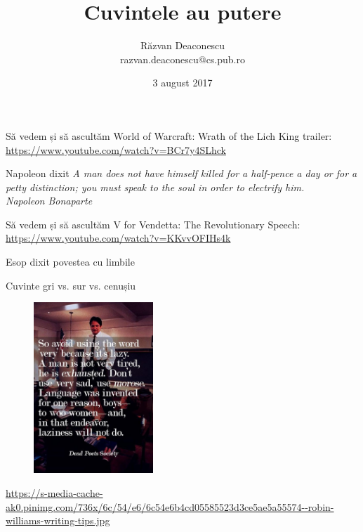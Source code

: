 \documentclass{simple}
\title[Cuvintele au putere]{Cuvintele au putere}
\institute{InfoEducație 2017 (Gălăciuc, Vrancea)}
\author[Răzvan Deaconescu]{Răzvan Deaconescu \\
razvan.deaconescu@cs.pub.ro}
\date{3 august 2017}
\begin{document}
\frame{\titlepage}

\begin{frame}{Să vedem și să ascultăm}
  \centering
  World of Warcraft: Wrath of the Lich King trailer: \url{https://www.youtube.com/watch?v=BCr7y4SLhck}
\end{frame}

\begin{frame}{Napoleon dixit}
  \centering
  \textit{A man does not have himself killed for a half-pence a day or for a petty distinction; you must speak to the soul in order to electrify him.}\\
  \vspace{3mm}
  \hfill \textit{Napoleon Bonaparte}
\end{frame}

\begin{frame}{Să vedem și să ascultăm}
  \centering
  V for Vendetta: The Revolutionary Speech: \url{https://www.youtube.com/watch?v=KKvvOFIHs4k}
\end{frame}

\begin{frame}{Esop dixit}
  \centering
  povestea cu limbile
\end{frame}

\begin{frame}{Cuvinte}
  \pause
  \centering
  gri vs. sur vs. cenușiu\\
  \pause
  \begin{figure}
    \centering
    \includegraphics[width=0.4\textwidth]{img/dead-poets-society-lazy}
  \end{figure}
  \tiny
  \url{https://s-media-cache-ak0.pinimg.com/736x/6c/54/e6/6c54e6b4cd05585523d3ce5ae5a55574--robin-williams-writing-tips.jpg}
\end{frame}
\end{document}

